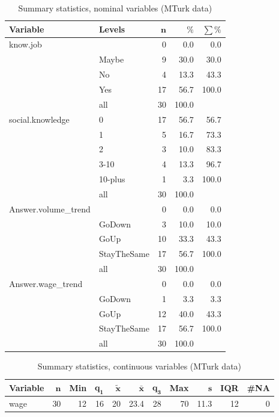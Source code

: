 \documentclass[a4paper,10pt]{article}\usepackage[]{graphicx}\usepackage[]{color}
\begin{document}
\begin{table}[ht]
\centering
{\footnotesize
\begin{tabular}{ll|rrr}
 \textbf{Variable} & \textbf{Levels} & $\mathbf{n}$ & $\mathbf{\%}$ & $\mathbf{\sum \%}$ \\ 
  \hline
know.job &  & 0 & 0.0 & 0.0 \\ 
   & Maybe & 9 & 30.0 & 30.0 \\ 
   & No & 4 & 13.3 & 43.3 \\ 
   & Yes & 17 & 56.7 & 100.0 \\ 
   \hline
 & all & 30 & 100.0 &  \\ 
   \hline
\hline
social.knowledge & 0 & 17 & 56.7 & 56.7 \\ 
   & 1 & 5 & 16.7 & 73.3 \\ 
   & 2 & 3 & 10.0 & 83.3 \\ 
   & 3-10 & 4 & 13.3 & 96.7 \\ 
   & 10-plus & 1 & 3.3 & 100.0 \\ 
   \hline
 & all & 30 & 100.0 &  \\ 
   \hline
\hline
Answer.volume\_trend &  & 0 & 0.0 & 0.0 \\ 
   & GoDown & 3 & 10.0 & 10.0 \\ 
   & GoUp & 10 & 33.3 & 43.3 \\ 
   & StayTheSame & 17 & 56.7 & 100.0 \\ 
   \hline
 & all & 30 & 100.0 &  \\ 
   \hline
\hline
Answer.wage\_trend &  & 0 & 0.0 & 0.0 \\ 
   & GoDown & 1 & 3.3 & 3.3 \\ 
   & GoUp & 12 & 40.0 & 43.3 \\ 
   & StayTheSame & 17 & 56.7 & 100.0 \\ 
   \hline
 & all & 30 & 100.0 &  \\ 
   \hline
\hline
\end{tabular}
}
\caption{Summary statistics, nominal variables (MTurk data)} 
\label{tab1:25-1190}
\end{table}
\begin{table}[ht]
\centering
{\footnotesize
\begin{tabular}{lrrrrrrrrrr}
 \textbf{Variable} & $\mathbf{n}$ & \textbf{Min} & $\mathbf{q_1}$ & $\mathbf{\widetilde{x}}$ & $\mathbf{\bar{x}}$ & $\mathbf{q_3}$ & \textbf{Max} & $\mathbf{s}$ & \textbf{IQR} & \textbf{\#NA} \\ 
  \hline
wage & 30 & 12 & 16 & 20 & 23.4 & 28 & 70 & 11.3 & 12 & 0 \\ 
  \end{tabular}
}
\caption{Summary statistics, continuous variables (MTurk data)} 
\label{tab2:25-1190}
\end{table}
\end{document}
